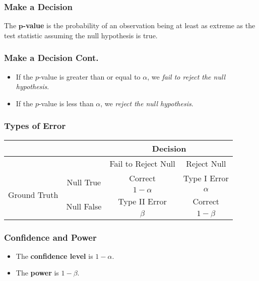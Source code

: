 \documentclass{beamer}
\begin{document}
\begin{frame}
\frametitle{Make a Decision}
\begin{Definition}
The $\boldsymbol p${\bf -value} is the probability of an observation being at least as extreme as the test statistic assuming the null hypothesis is true.
\end{Definition}

\end{frame}

\begin{frame}
\frametitle{Make a Decision Cont.}
\begin{itemize}
\item If the $p$-value is greater than or equal to $\alpha$, we {\it fail to reject the null hypothesis}.
\item If the $p$-value is less than $\alpha$, we {\it reject the null hypothesis}.
\end{itemize}
\end{frame}

\begin{frame}
\frametitle{Types of Error}
\begin{center}
\begin{tabular}{ c | c | c c }
							&						&	\multicolumn{2}{c}{Decision}		\\ \hline
							&						&	Fail to Reject Null	&	Reject Null	\\\hline
\multirow{4}{*}{Ground Truth}		&	\multirow{2}{*}{Null True}	&	Correct			&	Type I Error	\\
							&						&	$1 - \alpha$		&	$\alpha$		\\
							&	\multirow{2}{*}{Null False}	&	Type II Error		&	Correct		\\
							&						&	$\beta$			&	$1 - \beta$	\\		
\end{tabular}
\end{center}

\end{frame}

\begin{frame}
\frametitle{Confidence and Power}
\begin{Definition}
\begin{itemize}
\item The {\bf confidence level} is $1-\alpha$.
\item The {\bf power} is $1 - \beta$.
\end{itemize}
\end{Definition}
\end{frame}
\end{document}
